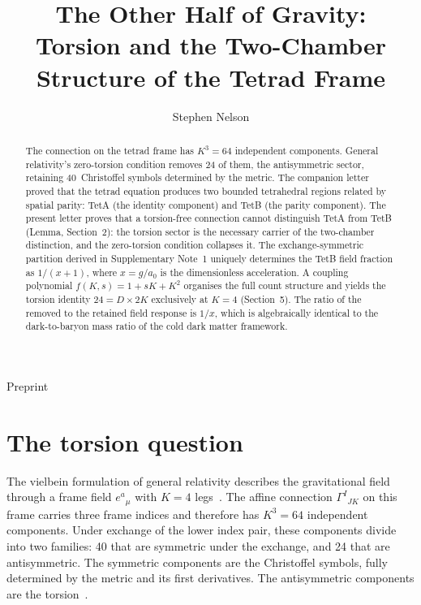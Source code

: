 \documentclass[twocolumn]{iopjournal}
\renewcommand{\articletype}[1]{%
  {\vspace*{-8mm}\noindent \Large \sf Preprint}\par
  \vspace*{6mm}\noindent{\scriptsize \sf{\bfseries \MakeUppercase{#1}}}}
\begin{document}
\articletype{Letter}

\title{The Other Half of Gravity:\\
Torsion and the Two-Chamber Structure of the Tetrad Frame}

\author{Stephen Nelson}



\begin{abstract}
The connection on the tetrad frame has $K^3 = 64$
independent components. General relativity's zero-torsion
condition removes 24 of them, the antisymmetric sector,
retaining 40~Christoffel symbols determined by the metric. The
companion letter~\cite{Nelson2026a} proved that the tetrad
equation produces two bounded tetrahedral regions related by
spatial parity: TetA (the identity component) and TetB (the
parity component). The present letter proves that a torsion-free
connection cannot distinguish TetA from TetB (Lemma, Section~2):
the torsion sector is the necessary carrier of the two-chamber
distinction, and the zero-torsion condition collapses it. The
exchange-symmetric partition
derived in Supplementary Note~1 uniquely determines the TetB
field fraction as $1/(x{+}1)$, where
$x = g/a_0$ is the dimensionless acceleration. A coupling
polynomial $f(K,s) = 1 + sK + K^2$ organises
the full count structure and yields the torsion identity
$24 = D \times 2K$ exclusively at $K = 4$ (Section~5). The ratio
of the removed to the retained field response is $1/x$, which is
algebraically identical to the dark-to-baryon mass ratio of the
cold dark matter framework.
\end{abstract}


\section{The torsion question}

The vielbein formulation of general relativity describes the
gravitational field through a frame field $e^a{}_\mu$ with
$K = 4$ legs~\cite{MTW}. The affine connection
$\Gamma^I{}_{JK}$ on this frame carries three frame indices and
therefore has $K^3 = 64$ independent components. Under exchange
of the lower index pair, these components divide into two
families: 40 that are symmetric under the exchange, and 24 that
are antisymmetric. The symmetric components are the Christoffel
symbols, fully determined by the metric and its first
derivatives. The antisymmetric components are the
torsion~\cite{Hehl1976}.
\end{document}
